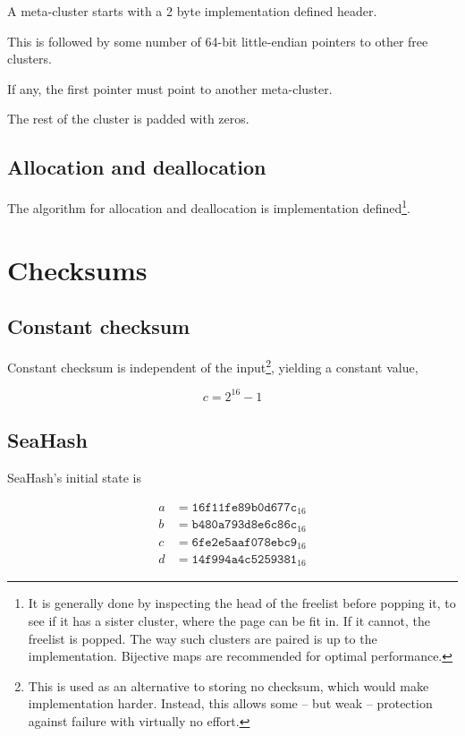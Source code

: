 \documentclass[11pt,a4paper]{report}
\begin{document}
        A meta-cluster starts with a 2 byte implementation defined header.

        This is followed by some number of 64-bit little-endian pointers to
        other free clusters.

        If any, the first pointer must point to another meta-cluster.

        The rest of the cluster is padded with zeros.

        \subsection{Allocation and deallocation}
        The algorithm for allocation and deallocation is implementation
        defined\footnote{It is generally done by inspecting the head of the
            freelist before popping it, to see if it has a sister cluster,
            where the page can be fit in. If it cannot, the freelist is popped.
            The way such clusters are paired is up to the implementation.
            Bijective maps are recommended for optimal performance.}.

    \section{Checksums}
        \subsection{Constant checksum}
        \label{checksum:constant}
        Constant checksum is independent of the input\footnote{This is used as
        an alternative to storing no checksum, which would make implementation
        harder. Instead, this allows some -- but weak -- protection against failure
        with virtually no effort.}, yielding a constant value,

        $$c = 2^{16} - 1$$

        \subsection{SeaHash}
        \label{checksum:seahash}
        SeaHash's initial state is

        \begin{align*}
            a &= \texttt{16f11fe89b0d677c}_{16} \\
            b &= \texttt{b480a793d8e6c86c}_{16} \\
            c &= \texttt{6fe2e5aaf078ebc9}_{16} \\
            d &= \texttt{14f994a4c5259381}_{16}
        \end{align*}
\end{document}
